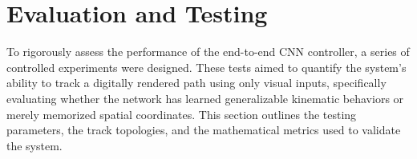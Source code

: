 





\section{Evaluation and Testing}

To rigorously assess the performance of the end-to-end CNN controller, a series of
controlled experiments were designed. These tests aimed to quantify the system's ability to
track a digitally rendered path using only visual inputs, specifically evaluating whether the
network has learned generalizable kinematic behaviors or merely memorized spatial
coordinates. This section outlines the testing parameters, the track topologies, and the
mathematical metrics used to validate the system.

